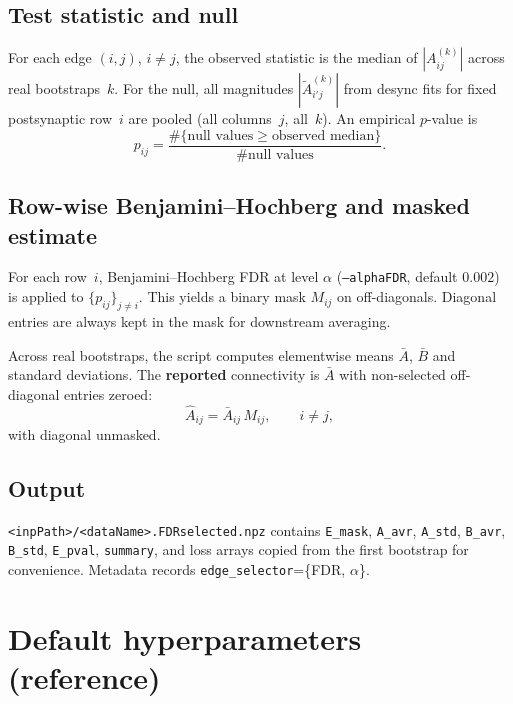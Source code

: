 \documentclass[11pt]{article}
\begin{document}
\subsection{Test statistic and null}

For each edge $(i,j)$, $i\neq j$, the observed statistic is the median of $|A^{(k)}_{ij}|$ across real bootstraps~$k$. For the null, all magnitudes $|\tilde{A}^{(k)}_{i' j}|$ from desync fits for fixed postsynaptic row~$i$ are pooled (all columns~$j$, all~$k$). An empirical $p$-value is
\begin{equation}
  p_{ij} = \frac{\#\{\text{null values} \ge \text{observed median}\}}{\#\text{null values}}.
\end{equation}

\subsection{Row-wise Benjamini--Hochberg and masked estimate}

For each row~$i$, Benjamini--Hochberg FDR at level $\alpha$ (\texttt{--alphaFDR}, default $0.002$) is applied to $\{p_{ij}\}_{j\neq i}$. This yields a binary mask $M_{ij}$ on off-diagonals. Diagonal entries are always kept in the mask for downstream averaging.

Across real bootstraps, the script computes elementwise means $\bar{A}$, $\bar{B}$ and standard deviations. The \textbf{reported} connectivity is $\bar{A}$ with non-selected off-diagonal entries zeroed:
\begin{equation}
  \widehat{A}_{ij} = \bar{A}_{ij}\, M_{ij},\qquad i\neq j,
\end{equation}
with diagonal unmasked.

\subsection{Output}

\texttt{<inpPath>/<dataName>.FDRselected.npz} contains \texttt{E\_mask}, \texttt{A\_avr}, \texttt{A\_std}, \texttt{B\_avr}, \texttt{B\_std}, \texttt{E\_pval}, \texttt{summary}, and loss arrays copied from the first bootstrap for convenience. Metadata records \texttt{edge\_selector}=\{FDR, $\alpha$\}.

\section{Default hyperparameters (reference)}
\label{sec:defaults}
\end{document}
